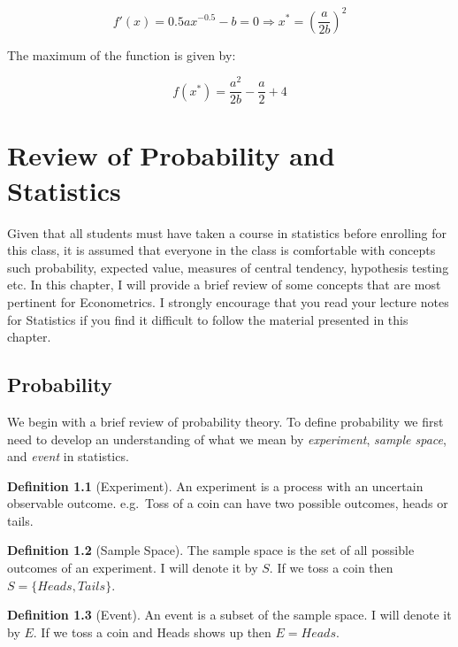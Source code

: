 \documentclass[
]{book}
\theoremstyle{definition}
\newtheorem{definition}{Definition}[chapter]
\theoremstyle{definition}
\theoremstyle{definition}
\theoremstyle{definition}
\theoremstyle{remark}
\begin{document}
\[f'(x)= 0.5ax^{-0.5}-b=0 \Rightarrow x^*=\left(\frac{a}{2b}\right )^2\]

The maximum of the function is given by:

\[f(x^*) = \frac{a^2}{2b}-\frac{a}{2}+4\]

\hypertarget{review-of-probability-and-statistics}{%
\chapter{Review of Probability and Statistics}\label{review-of-probability-and-statistics}}

Given that all students must have taken a course in statistics before enrolling for this class, it is assumed that everyone in the class is comfortable with concepts such probability, expected value, measures of central tendency, hypothesis testing etc. In this chapter, I will provide a brief review of some concepts that are most pertinent for Econometrics. I strongly encourage that you read your lecture notes for Statistics if you find it difficult to follow the material presented in this chapter.

\hypertarget{probability}{%
\section{Probability}\label{probability}}

We begin with a brief review of probability theory. To define probability we first need to develop an understanding of what we mean by \emph{experiment}, \emph{sample space}, and \emph{event} in statistics.

\begin{definition}[Experiment]
\protect\hypertarget{def:unnamed-chunk-21}{}\label{def:unnamed-chunk-21}An experiment is a process with an uncertain observable outcome. e.g.~Toss of a coin can have two possible outcomes, heads or tails.
\end{definition}

\begin{definition}[Sample Space]
\protect\hypertarget{def:unnamed-chunk-22}{}\label{def:unnamed-chunk-22}The sample space is the set of all possible outcomes of an experiment. I will denote it by \(S\). If we toss a coin then \(S=\{Heads,Tails\}\).
\end{definition}

\begin{definition}[Event]
\protect\hypertarget{def:unnamed-chunk-23}{}\label{def:unnamed-chunk-23}An event is a subset of the sample space. I will denote it by \(E\). If we toss a coin and Heads shows up then \(E={Heads}\).
\end{definition}
\end{document}
